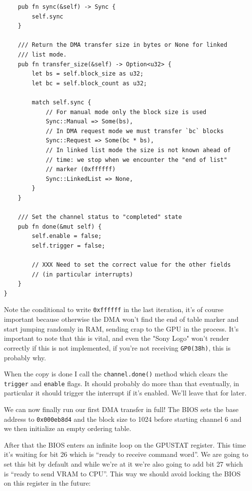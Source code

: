 \documentclass[a4paper]{article}
\newcommand{\code}[1] {\texttt{#1}}
\begin{document}
\begin{lstlisting}
    pub fn sync(&self) -> Sync {
        self.sync
    }

    /// Return the DMA transfer size in bytes or None for linked
    /// list mode.
    pub fn transfer_size(&self) -> Option<u32> {
        let bs = self.block_size as u32;
        let bc = self.block_count as u32;

        match self.sync {
            // For manual mode only the block size is used
            Sync::Manual => Some(bs),
            // In DMA request mode we must transfer `bc` blocks
            Sync::Request => Some(bc * bs),
            // In linked list mode the size is not known ahead of
            // time: we stop when we encounter the "end of list"
            // marker (0xffffff)
            Sync::LinkedList => None,
        }
    }

    /// Set the channel status to "completed" state
    pub fn done(&mut self) {
        self.enable = false;
        self.trigger = false;

        // XXX Need to set the correct value for the other fields
        // (in particular interrupts)
    }
}
\end{lstlisting}

Note the conditional to write \code{0xffffff} in the last iteration,
it's of course important because otherwise the DMA won't find the end
of table marker and start jumping randomly in RAM, sending crap to the
GPU in the process. It's important to note that this is vital, and even
the "Sony Logo" won't render correctly if this is not implemented, if
you're not receiving \code{GP0(38h)}, this is probably why.

When the copy is done I call the \code{channel.done()} method which
clears the \code{trigger} and \code{enable} flags. It should probably
do more than that eventually, in particular it should trigger the
interrupt if it's enabled. We'll leave that for later.

We can now finally run our first DMA transfer in full! The BIOS sets
the base address to \code{0x000eb8d4} and the block size to 1024
before starting channel 6 and we then initialize an empty ordering
table.

After that the BIOS enters an infinite loop on the GPUSTAT
register. This time it's waiting for bit 26 which is ``ready to
receive command word''. We are going to set this bit by default and
while we're at it we're also going to add bit 27 which is ``ready to
send VRAM to CPU''. This way we should avoid locking the BIOS on this
register in the future:
\end{document}
